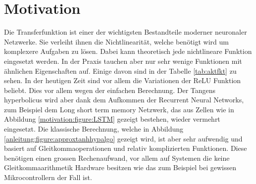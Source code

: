 %
%
%
\section{Motivation\label{transfer:section:teil0}}

Die Transferfunktion ist einer der wichtigsten Bestandteile moderner neuronaler Netzwerke. Sie verleiht ihnen die Nichtlinearität, welche benötigt wird um komplexere Aufgaben zu lösen. Dabei kann theoretisch jede nichtlineare Funktion eingesetzt werden. In der Praxis tauchen aber nur sehr wenige Funktionen mit ähnlichen Eigenschaften auf. Einige davon sind in der Tabelle \ref{tab:aktfkt} zu sehen. In der heutigen Zeit sind vor allem die Variationen der ReLU Funktion beliebt. Dies vor allem wegen der einfachen Berechnung.
Der Tangens hyperbolicus wird aber dank dem Aufkommen der Recurrent Neural Networks, zum Beispiel dem Long short term memory Netzwerk, das aus Zellen wie in Abbildung \ref{motivation:figure:LSTM} gezeigt bestehen, wieder vermehrt eingesetzt.
Die klassische Berechnung, welche in Abbildung \ref{anleitung:figure:approxtanhhypalgo} gezeigt wird, ist aber sehr aufwendig und basiert auf Gleitkommaoperationen und relativ komplizierten Funktionen. Diese benötigen einen grossen Rechenaufwand, vor allem auf Systemen die keine Gleitkommaarithmetik Hardware besitzen wie das zum Beispiel bei gewissen Mikrocontrollern der Fall ist.
